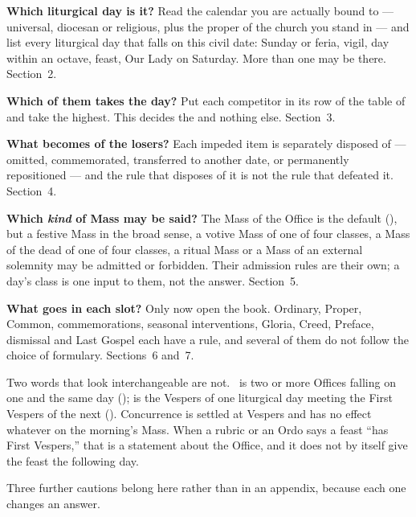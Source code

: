 \begin{steps}
\item \textbf{Which liturgical day is it?} Read the calendar you are actually
bound to --- universal, diocesan or religious, plus the proper of the church
you stand in --- and list every liturgical day that falls on this civil date:
Sunday or feria, vigil, day within an octave, feast, Our Lady on Saturday.
More than one may be there. Section~2.

\item \textbf{Which of them takes the day?} Put each competitor in its row of
the table of  and take the highest. This decides the  and nothing else. Section~3.

\item \textbf{What becomes of the losers?} Each impeded item is separately
disposed of --- omitted, commemorated, transferred to another date, or
permanently repositioned --- and the rule that disposes of it is not the rule
that defeated it. Section~4.

\item \textbf{Which \emph{kind} of Mass may be said?} The Mass of the Office
is the default (), but a festive Mass in the broad sense, a votive
Mass of one of four classes, a Mass of the dead of one of four classes, a
ritual Mass or a Mass of an external solemnity may be admitted or forbidden.
Their admission rules are their own; a day's class is one input to them, not
the answer. Section~5.

\item \textbf{What goes in each slot?} Only now open the book. Ordinary,
Proper, Common, commemorations, seasonal interventions, Gloria, Creed,
Preface, dismissal and Last Gospel each have a rule, and several of them do
not follow the choice of formulary. Sections~6 and~7.
\end{steps}

Two words that look interchangeable are not.\  is two or more
Offices falling on one and the same day ();  is the
Vespers of one liturgical day meeting the First Vespers of the next
(). Concurrence is settled at Vespers and has no effect whatever on
the morning's Mass. When a rubric or an Ordo says a feast ``has First
Vespers,'' that is a statement about the Office, and it does not by itself
give the feast the following day.

Three further cautions belong here rather than in an appendix, because each
one changes an answer.

